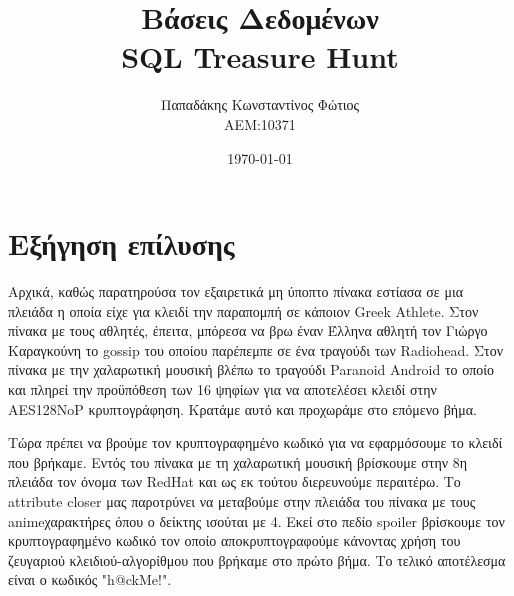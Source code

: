 \documentclass[twocolumn]{report}
\begin{document}

\title{\Huge \bfseries Βάσεις Δεδομένων \\ SQL Treasure Hunt} %
\author{Παπαδάκης Κωνσταντίνος Φώτιος\vspace{0.5cm} \\  ΑΕΜ:10371} %
\date{\today}
\maketitle

\section*{Εξήγηση επίλυσης}
Αρχικά, καθώς παρατηρούσα τον εξαιρετικά μη ύποπτο πίνακα εστίασα σε μια πλειάδα
η οποία είχε για κλειδί την παραπομπή σε κάποιον Greek Athlete.
Στον πίνακα με τους αθλητές, έπειτα, μπόρεσα να βρω έναν Έλληνα αθλητή 
τον Γιώργο Καραγκούνη το gossip του οποίου παρέπεμπε 
σε ένα τραγούδι των Radiohead. Στον πίνακα
με την χαλαρωτική μουσική βλέπω το τραγούδι Paranoid Android 
το οποίο και πληρεί την προϋπόθεση των 16 ψηφίων για να αποτελέσει
κλειδί στην AES128NoP κρυπτογράφηση. 
Κρατάμε αυτό και προχωράμε στο επόμενο βήμα.

\smallskip

Τώρα πρέπει να βρούμε τον κρυπτογραφημένο κωδικό για να εφαρμόσουμε το κλειδί που βρήκαμε.
Εντός του πίνακα με τη χαλαρωτική μουσική βρίσκουμε στην 8η πλειάδα τον όνομα των 
RedHat και ως εκ τούτου διερευνούμε περαιτέρω.
Το attribute closer μας παροτρύνει να μεταβούμε 
στην πλειάδα του πίνακα με τους animeχαρακτήρες 
όπου ο δείκτης ισούται με 4. Εκεί στο πεδίο spoiler 
βρίσκουμε τον κρυπτογραφημένο κωδικό τον οποίο αποκρυπτογραφούμε κάνοντας χρήση του ζευγαριού 
κλειδιού-αλγορίθμου που βρήκαμε στο πρώτο βήμα. Το τελικό αποτέλεσμα είναι ο κωδικός
"h@ckMe!".
\end{document}
